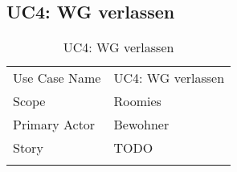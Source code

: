 \subsection{UC4: WG verlassen}
\begin{table}[H]
	\tablestyle
	\tablealtcolored
	\begin{tabularx}{\textwidth}{lX}
		\tablebody
			Use Case Name &
			UC4: WG verlassen
			\tabularnewline
			Scope &
			Roomies
			\tabularnewline
			Primary Actor &
			Bewohner
			\tabularnewline
			Story &
			TODO
			\tabularnewline
		\tableend
	\end{tabularx}
	\caption{UC4: WG verlassen}
\end{table}


